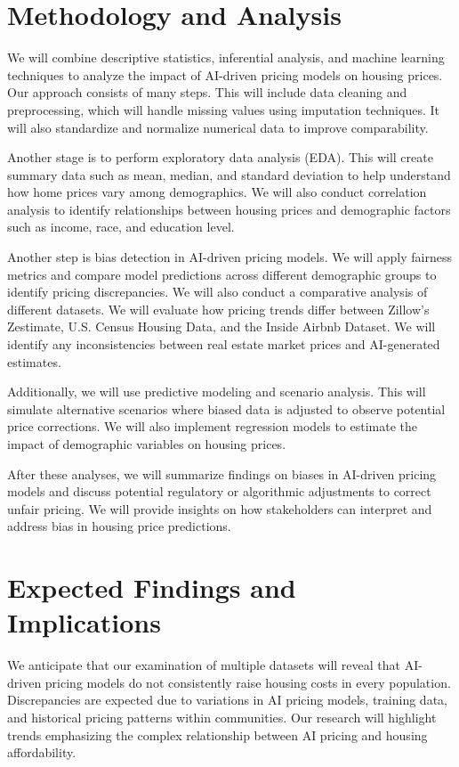 \documentclass{article}
\begin{document}
\section{Methodology and Analysis}

We will combine descriptive statistics, inferential analysis, and machine learning techniques to analyze the impact of AI-driven pricing models on housing prices. Our approach consists of many steps. This will include data cleaning and preprocessing, which will handle missing values using imputation techniques. It will also standardize and normalize numerical data to improve comparability.

Another stage is to perform exploratory data analysis (EDA). This will create summary data such as mean, median, and standard deviation to help understand how home prices vary among demographics. We will also conduct correlation analysis to identify relationships between housing prices and demographic factors such as income, race, and education level.

Another step is bias detection in AI-driven pricing models. We will apply fairness metrics and compare model predictions across different demographic groups to identify pricing discrepancies. We will also conduct a comparative analysis of different datasets. We will evaluate how pricing trends differ between Zillow’s Zestimate, U.S. Census Housing Data, and the Inside Airbnb Dataset. We will identify any inconsistencies between real estate market prices and AI-generated estimates.

Additionally, we will use predictive modeling and scenario analysis. This will simulate alternative scenarios where biased data is adjusted to observe potential price corrections. We will also implement regression models to estimate the impact of demographic variables on housing prices.

After these analyses, we will summarize findings on biases in AI-driven pricing models and discuss potential regulatory or algorithmic adjustments to correct unfair pricing. We will provide insights on how stakeholders can interpret and address bias in housing price predictions.

\section{Expected Findings and Implications}
We anticipate that our examination of multiple datasets will reveal that AI-driven pricing models do not consistently raise housing costs in every population. Discrepancies are expected due to variations in AI pricing models, training data, and historical pricing patterns within communities. Our research will highlight trends emphasizing the complex relationship between AI pricing and housing affordability.
\end{document}
